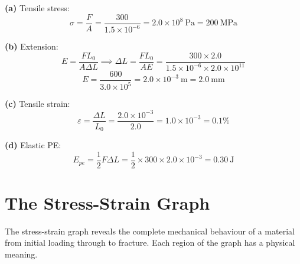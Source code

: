 \begin{solutionbox}
\textbf{(a)} Tensile stress:
\[
  \sigma = \frac{F}{A}
  = \frac{300}{1.5\times10^{-6}}
  = 2.0\times10^8\ \text{Pa} = 200\ \text{MPa}
\]

\textbf{(b)} Extension:
\[
  E = \frac{FL_0}{A\Delta L}
  \implies \Delta L = \frac{FL_0}{AE}
  = \frac{300 \times 2.0}{1.5\times10^{-6}
    \times 2.0\times10^{11}}
\]
\[
  E = \frac{600}{3.0\times10^5}
  = 2.0\times10^{-3}\ \text{m} = 2.0\ \text{mm}
\]

\textbf{(c)} Tensile strain:
\[
  \varepsilon = \frac{\Delta L}{L_0}
  = \frac{2.0\times10^{-3}}{2.0}
  = 1.0\times10^{-3} = 0.1\%
\]

\textbf{(d)} Elastic PE:
\[
  E_{pe} = \frac{1}{2}F\Delta L
  = \frac{1}{2} \times 300 \times 2.0\times10^{-3}
  = 0.30\ \text{J}
\]
\end{solutionbox}

\section{The Stress-Strain Graph}

The stress-strain graph reveals the complete mechanical
behaviour of a material from initial loading through
to fracture. Each region of the graph has a physical
meaning.

